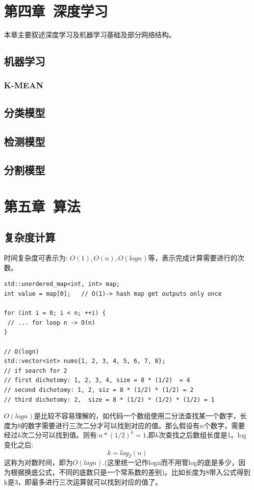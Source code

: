 \documentclass[12pt]{book}
\begin{document}
\fancyhead{}

\chapter{第四章\ 深度学习}
本章主要叙述深度学习及机器学习基础及部分网络结构。

\section{机器学习}
\subsection{K-MEAN}
\section{分类模型}
\section{检测模型}
\section{分割模型}

\newpage

\fancyhead{}

\chapter{第五章\ 算法}
\section{复杂度计算}
时间复杂度可表示为: $O(1), O(n), O(logn)$等，表示完成计算需要进行的次数。
\begin{lstlisting}
std::unordered_map<int, int> map;
int value = map[0];   // O(1)-> hash map get outputs only once

for (int i = 0; i < n; ++i) {
 // ... for loop n -> O(n)
}

// O(logn)
std::vector<int> nums{1, 2, 3, 4, 5, 6, 7, 8};
// if search for 2
// first dichotomy: 1, 2, 3, 4, size = 8 * (1/2)  = 4
// second dichotomy: 1, 2, siz = 8 * (1/2) * (1/2) = 2
// third dichotomy: 2,  size = 8 * (1/2) * (1/2) * (1/2) = 1
\end{lstlisting}
$O(logn)$是比较不容易理解的，如代码一个数组使用二分法查找某一个数字，长度为8的数字需要进行三次二分才可以找到对应的值。那么假设有$n$个数字，需要经过$k$次二分可以找到值。则有:$n * (1/2)^k = 1$,即$k$次查找之后数组长度是1。log变化之后:
\begin{equation}\label{log-algorithm-time}
k = log_2(n)
\end{equation}
这称为对数时间，即为$O(logn)$.(这里统一记作logn而不用管log的底是多少，因为根据换底公式，不同的底数只是一个常系数的差别)。比如长度为8带入公式得到k是3，即最多进行三次运算就可以找到对应的值了。
\end{document}
